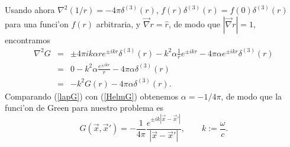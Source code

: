 Usando ahora $\nabla^2\left({1}/{r}\right) =-4\pi\delta^{(3)}(r)$,
$f(r)\delta^{(3)}(r)=f(0)\delta^{(3)}(r)$ para una funci'on $f(r)$ arbitraria, y
$\vec{\nabla}r=\hat{r}$, de modo que $|\vec{\nabla}r|=1$,
encontramos
\begin{eqnarray}
\nabla^2G&=&\pm 4\pi ik\alpha r  e^{\pm ikr}\delta^{(3)}(r) -k^2\alpha \frac{1}{r}
e^{\pm ikr}-4\pi\alpha e^{\pm ikr}\delta^{(3)}(r) \\
&=&0-k^2\alpha \frac{e^{\pm ikr}}{r}   -4\pi\alpha \delta^{(3)}(r) \\
&=&-k^2G(r) -4\pi\alpha \delta^{(3)}(r) .\label{lapG}
\end{eqnarray}
Comparando (\ref{lapG}) con (\ref{HelmG}) obtenemos $\alpha=-{1}/{4\pi}$, de
modo que la funci'on de Green para nuestro problema es
\begin{equation}
\boxed{G(\vec{x},\vec{x}')=-\frac{1}{4\pi}\frac{e^{\pm
ik|\vec{x}-\vec{x}'|}}{|\vec{x}-\vec{x}'|}, \qquad k:=\frac{\omega}{c}.} \label{GreenH}
\end{equation}


